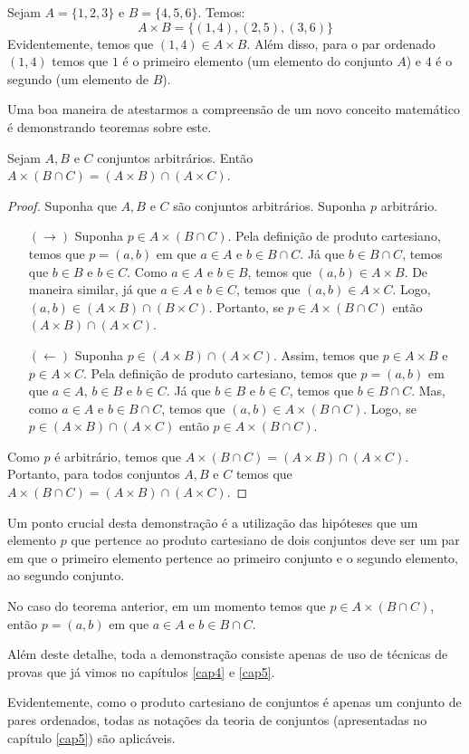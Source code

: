 \begin{Example}
Sejam $A =\{1,2,3\}$ e $B = \{4,5,6\}$. Temos:
\[
A \times B = \{(1,4),(2,5),(3,6)\}
\]
Evidentemente, temos que $(1,4) \in A \times B$. Além disso, para o
par ordenado $(1,4)$ temos que $1$ é o primeiro elemento (um elemento
do conjunto $A$) e $4$ é o segundo (um elemento de $B$).
\end{Example}
Uma boa maneira de atestarmos a compreensão de um novo conceito
matemático é demonstrando teoremas sobre este.
\begin{Theorem}
Sejam $A, B$ e $C$ conjuntos arbitrários. Então $A \times (B\cap C) =
(A \times B) \cap (A \times C)$.
\end{Theorem}
\begin{proof}
Suponha que $A,B$ e $C$ são conjuntos arbitrários. Suponha $p$
arbitrário.
\begin{itemize}
   \item[$(\to)$] Suponha $p \in A \times (B \cap C)$. Pela definição
     de produto cartesiano, temos que $p = (a,b)$ em que $a \in A$ e
     $b \in B \cap C$. Já que $b\in B\cap C$, temos que $b \in B$ e $b
     \in C$. Como $a \in A$ e $b \in B$, temos que $(a,b)\in A \times
     B$. De maneira similar, já que $a \in A$ e $b \in C$, temos que
     $(a,b) \in A \times C$. Logo, $(a,b) \in (A\times B) \cap
     (B\times C)$. Portanto, se $p \in A\times (B\cap C)$ então
     $(A\times B)\cap (A \times C)$.
   \item[$(\leftarrow)$] Suponha $p\in (A\times B) \cap (A \times
     C)$. Assim, temos que $p \in A \times B$ e $p \in A \times C$.
     Pela definição de produto cartesiano, temos que $p = (a,b)$ em
     que $a \in A$, $b \in B$ e $b\in C$. Já que $b\in B$ e $b\in C$,
     temos que $b\in B\cap C$. Mas, como $a \in A$ e $b\in B\cap C$,
     temos que $(a,b)\in A\times (B\cap C)$. Logo, se $p \in (A\times
     B) \cap (A \times C)$ então $p \in A \times (B\cap C)$.
\end{itemize}
Como $p$ é arbitrário, temos que $A \times (B\cap C) = (A \times B)
\cap (A \times C)$. Portanto, para todos conjuntos $A,B$ e $C$ temos
que $A \times (B\cap C) = (A \times B)
\cap (A \times C)$.
\end{proof}

\begin{Commentary}
Um ponto crucial desta demonstração é a utilização das hipóteses que
um elemento $p$ que pertence ao produto cartesiano de dois conjuntos
deve ser um par em que o primeiro elemento pertence ao primeiro
conjunto e o segundo elemento, ao segundo conjunto.

No caso do teorema anterior, em um momento temos que $p \in A \times
(B\cap C)$, então $p = (a,b)$ em que $a \in A$ e $b \in B\cap C$.

Além deste
detalhe, toda a demonstração consiste apenas de uso de técnicas de
provas que já vimos no capítulos \ref{cap4} e \ref{cap5}.

Evidentemente, como o produto cartesiano de conjuntos é apenas um
conjunto de pares ordenados, todas as notações da teoria de conjuntos
(apresentadas no capítulo \ref{cap5}) são aplicáveis.
\end{Commentary}

